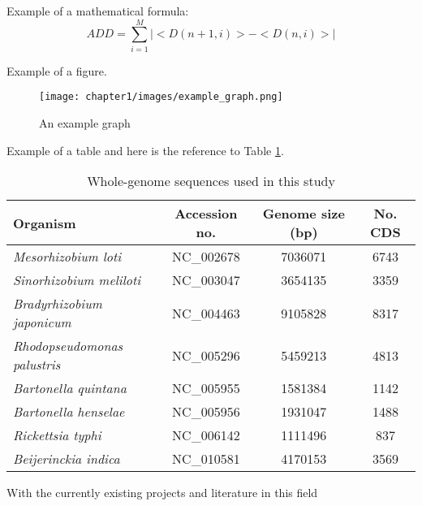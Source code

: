 Example of a mathematical formula:
\begin{equation}
  ADD = \sum_{i=1}^{M}|<D(n+1,i)>-<D(n,i)>|
  \label{add}
\end{equation}

Example of a figure.
\begin{figure}[ht!]
\begin{center}
\texttt{[image: chapter1/images/example\_graph.png]}
\end{center}
\caption{An example graph}
\label{graph1}
\end{figure}

Example of a table and here is the reference to Table \ref{table_genomes}. 

\begin{table}
\begin{center}
\begin{tabular}{|l|c|c|c|}
\hline
{\sc Organism}  &  {\sc Accession no.}  & {\sc Genome size} (bp)  & {\sc No. CDS} \\
\hline
{\it Mesorhizobium loti}          & NC\_002678 & 7036071 & 6743 \\
\hline
{\it Sinorhizobium meliloti}      & NC\_003047 & 3654135 & 3359 \\
\hline
{\it Bradyrhizobium japonicum}    & NC\_004463 & 9105828 & 8317 \\
\hline
{\it Rhodopseudomonas palustris}  & NC\_005296 & 5459213 & 4813 \\
\hline
{\it Bartonella quintana}         & NC\_005955 & 1581384 & 1142 \\
\hline
{\it Bartonella henselae}         & NC\_005956 & 1931047 & 1488 \\
\hline
{\it Rickettsia typhi}            & NC\_006142 & 1111496 & 837 \\
\hline
{\it Beijerinckia indica}         & NC\_010581 & 4170153 & 3569 \\
\hline
\end{tabular}
\end{center}
\caption{Whole-genome sequences used in this study}
\label{table_genomes}
\end{table}

With the currently existing projects and literature in this field
